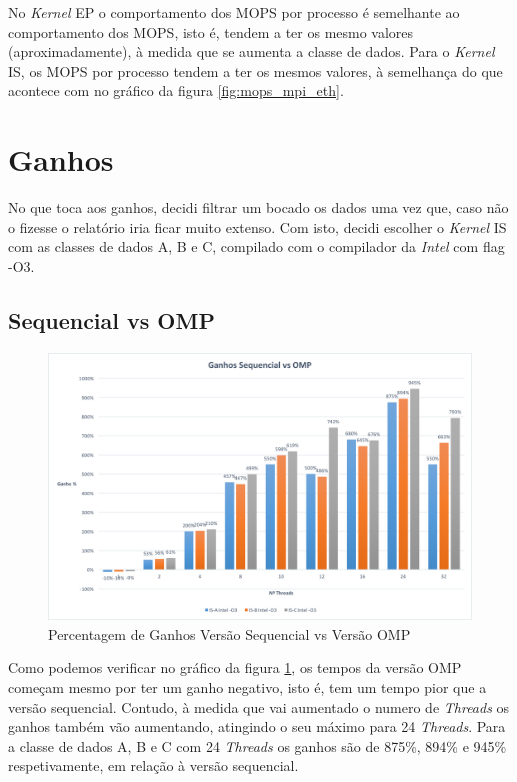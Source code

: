 \documentclass[conference,compsoc]{IEEEtran}
\begin{document}
No \textit{Kernel} EP o comportamento dos MOPS por processo é semelhante ao comportamento dos MOPS, isto é, tendem a ter os mesmo valores (aproximadamente), à medida que se aumenta a classe de dados. Para o \textit{Kernel} IS, os MOPS por processo tendem a ter os mesmos valores, à semelhança do que acontece com no gráfico da figura \ref{fig:mops_mpi_eth}.

\section{Ganhos}\label{sec:ganhos}

No que toca aos ganhos, decidi filtrar um bocado os dados uma vez que, caso não o fizesse o relatório iria ficar muito extenso. Com isto, decidi escolher o \textit{Kernel} IS com as classes de dados A, B e C, compilado com o compilador da \textit{Intel} com flag -O3.

\subsection{Sequencial vs OMP}

\begin{figure}[h!]
\centering
\includegraphics[scale=0.325]{ganhos_seq_vs_omp.png}
\caption{Percentagem de Ganhos Versão Sequencial vs Versão OMP}
\label{fig:ganhos_seq_vs_omp}
\end{figure}

Como podemos verificar no gráfico da figura \ref{fig:ganhos_seq_vs_omp}, os tempos da versão OMP começam mesmo por ter um ganho negativo, isto é, tem um tempo pior que a versão sequencial. Contudo, à medida que vai aumentado o numero de \textit{Threads} os ganhos também vão aumentando, atingindo o seu máximo para 24 \textit{Threads}. Para a classe de dados A, B e C com 24 \textit{Threads} os ganhos são de 875\%, 894\% e 945\% respetivamente, em relação à versão sequencial.
\end{document}
